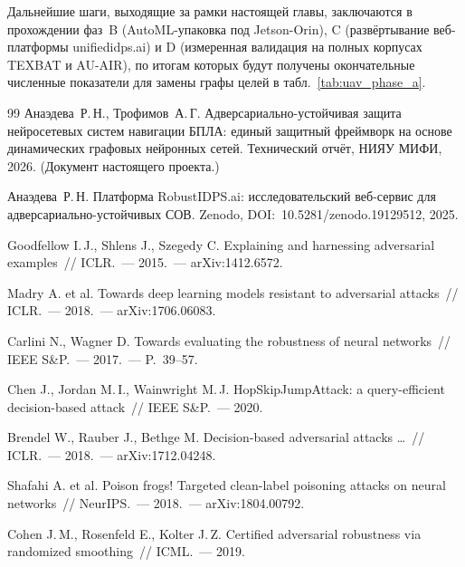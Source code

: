 Дальнейшие шаги, выходящие за рамки настоящей главы, заключаются в
прохождении фаз~B (AutoML-упаковка под Jetson-Orin), C (развёртывание
веб-платформы \textsf{unifiedidps.ai}) и D (измеренная валидация на
полных корпусах TEXBAT и AU-AIR), по итогам которых будут получены
окончательные численные показатели для замены графы целей в
табл.~\ref{tab:uav_phase_a}.

\begin{thebibliography}{99}
Анаэдева~Р.\,Н., Трофимов~А.\,Г. Адверсариально-устойчивая защита
нейросетевых систем навигации БПЛА: единый защитный фреймворк на
основе динамических графовых нейронных сетей. Технический отчёт,
НИЯУ МИФИ, 2026. (Документ настоящего проекта.)

Анаэдева~Р.\,Н. Платформа \textsf{RobustIDPS.ai}: исследовательский
веб-сервис для адверсариально-устойчивых СОВ. Zenodo,
DOI:~10.5281/zenodo.19129512, 2025.

Goodfellow I.\,J., Shlens J., Szegedy C. Explaining and harnessing
adversarial examples~// ICLR.~--- 2015.~--- arXiv:1412.6572.

Madry A. et al. Towards deep learning models resistant to adversarial
attacks~// ICLR.~--- 2018.~--- arXiv:1706.06083.

Carlini N., Wagner D. Towards evaluating the robustness of neural
networks~// IEEE S\&P.~--- 2017.~--- P.~39--57.

Chen J., Jordan M.\,I., Wainwright M.\,J. HopSkipJumpAttack: a
query-efficient decision-based attack~// IEEE S\&P.~--- 2020.

Brendel W., Rauber J., Bethge M. Decision-based adversarial attacks
\dots~// ICLR.~--- 2018.~--- arXiv:1712.04248.

Shafahi A. et al. Poison frogs! Targeted clean-label poisoning attacks
on neural networks~// NeurIPS.~--- 2018.~--- arXiv:1804.00792.

Cohen J.\,M., Rosenfeld E., Kolter J.\,Z. Certified adversarial
robustness via randomized smoothing~// ICML.~--- 2019.


\end{thebibliography}
